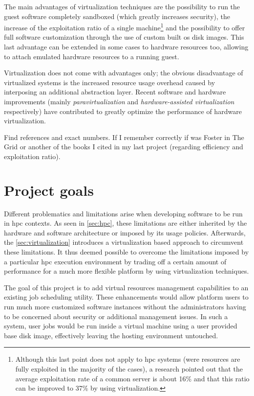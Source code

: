 The main advantages of virtualization techniques are the possibility to run the guest software completely sandboxed (which greatly increases security), the increase of the exploitation ratio of a single machine\footnote{Although this last point does not apply to \gls{hpc} systems (were resources are fully exploited in the majority of the cases), a research pointed out that the average exploitation rate of a common server is about 16\% and that this ratio can be improved to 37\% by using virtualization.} and the possibility to offer full software customization through the use of custom built \gls{os} disk images. This last advantage can be extended in some cases to hardware resources too, allowing to attach emulated hardware resources to a running guest.

Virtualization does not come with advantages only; the obvious disadvantage of virtualized systems is the increased resource usage overhead caused by interposing an additional abstraction layer. Recent software and hardware improvements (mainly \emph{paravirtualization} and \emph{hardware-assisted virtualization} respectively) have contributed to greatly optimize the performance of hardware virtualization.

\begin{todo}
Find references and exact numbers. If I remember correctly if was Foster in The Grid or another of the books I cited in my last project (regarding efficiency and exploitation ratio).
\end{todo}



\section{Project goals}
\label{sec:goals}

Different problematics and limitations arise when developing software to be run in \gls{hpc} contexts. As seen in \autoref{sec:hpc}, these limitations are either inherited by the hardware and software architecture or imposed by its usage policies. Afterwards, the \autoref{sec:virtualization} introduces a virtualization based approach to circumvent these limitations. It thus deemed possible to overcome the limitations imposed by a particular \gls{hpc} execution environment by trading off a certain amount of performance for a much more flexible platform by using virtualization techniques.

The goal of this project is to add virtual resources management capabilities to an existing job scheduling utility. These enhancements would allow platform users to run much more customized software instances without the administrators having to be concerned about security or additional management issues. In such a system, user jobs would be run inside a virtual machine using a user provided base disk image, effectively leaving the hosting environment untouched.


